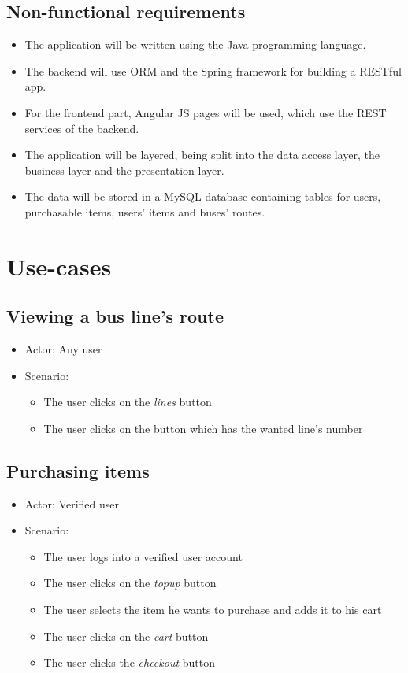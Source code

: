\documentclass[a4paper,12pt]{report}
\begin{document}
\section{Non-functional requirements}
\begin{itemize}
    \item The application will be written using the Java programming language.
    \item The backend will use ORM and the Spring framework for building a RESTful app.
    \item For the frontend part, Angular JS pages will be used, which use the REST services of the backend.
    \item The application will be layered, being split into the data access layer, the business layer and the presentation layer.
    \item The data will be stored in a MySQL database containing tables for users, purchasable items, users' items and buses' routes.
\end{itemize}


\chapter{Use-cases}
\section{Viewing a bus line's route}
\begin{itemize}
    \item Actor: Any user
    \item Scenario:
    \begin{itemize}
        \item The user clicks on the \textit{lines} button
        \item The user clicks on the button which has the wanted line's number
    \end{itemize}
\end{itemize}

\section{Purchasing items}
\begin{itemize}
    \item Actor: Verified user
    \item Scenario:
    \begin{itemize}
        \item The user logs into a verified user account
        \item The user clicks on the \textit{topup} button
        \item The user selects the item he wants to purchase and adds it to his cart
        \item The user clicks on the \textit{cart} button
        \item The user clicks the \textit{checkout} button
    \end{itemize}
\end{itemize}
\end{document}
